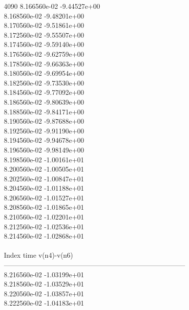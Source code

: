 4090	8.166560e-02	-9.44527e+00	\\ 	8.168560e-02	-9.48201e+00	\\ 	8.170560e-02	-9.51861e+00	\\ 	8.172560e-02	-9.55507e+00	\\ 	8.174560e-02	-9.59140e+00	\\ 	8.176560e-02	-9.62759e+00	\\ 	8.178560e-02	-9.66363e+00	\\ 	8.180560e-02	-9.69954e+00	\\ 	8.182560e-02	-9.73530e+00	\\ 	8.184560e-02	-9.77092e+00	\\ 	8.186560e-02	-9.80639e+00	\\ 	8.188560e-02	-9.84171e+00	\\ 	8.190560e-02	-9.87688e+00	\\ 	8.192560e-02	-9.91190e+00	\\ 	8.194560e-02	-9.94678e+00	\\ 	8.196560e-02	-9.98149e+00	\\ 	8.198560e-02	-1.00161e+01	\\ 	8.200560e-02	-1.00505e+01	\\ 	8.202560e-02	-1.00847e+01	\\ 	8.204560e-02	-1.01188e+01	\\ 	8.206560e-02	-1.01527e+01	\\ 	8.208560e-02	-1.01865e+01	\\ 	8.210560e-02	-1.02201e+01	\\ 	8.212560e-02	-1.02536e+01	\\ 	8.214560e-02	-1.02868e+01	\\ \hline
\\ \hline
Index   time            v(n4)-v(n6)     \\ \hline
--------------------------------------------------------------------------------\\ 	8.216560e-02	-1.03199e+01	\\ 	8.218560e-02	-1.03529e+01	\\ 	8.220560e-02	-1.03857e+01	\\ 	8.222560e-02	-1.04183e+01	\\ \hline
